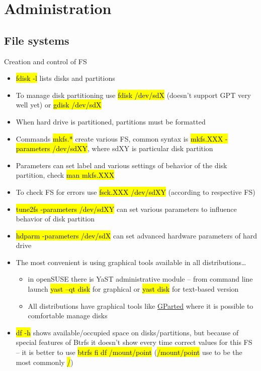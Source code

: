 \documentclass[compress, ucs, xelatex, 11pt, xcolor=svgnames,
  hyperref={
    bookmarks=true,
    unicode=true,
    colorlinks=true,
    pdftitle={Linux, command line and MetaCentrum},
    plainpages=false,
    pdfauthor={Vojtech Zeisek},
    pdfsubject={Course about use of Linux command line, writing shell scripts and using MetaCentrum of CESNET},
    pdfcreator={XeLaTeX},
    pdfkeywords={Linux, GNU, BASH, shell, command line, MetaCentrum},
    linkcolor=Red,
    anchorcolor=Blue,
    citecolor=Purple,
    filecolor=DodgerBlue,
    menucolor=DarkOrchid,
    urlcolor=DeepSkyBlue,
    pdftex},
  url={hyphens, lowtilde} %
  ]{beamer}
\renewcommand{\texttt}[1]{\hl{\ttfamily #1}}
\begin{document}
\section{Administration}

\subsection{File systems}

\begin{frame}[allowframebreaks]{Creation and control of FS}
\begin{itemize}
  \item \texttt{fdisk -l} lists disks and partitions
  \item To manage disk partitioning use \texttt{fdisk /dev/sdX} (doesn't support GPT very well yet) or \texttt{gdisk /dev/sdX}
  \item When hard drive is partitioned, partitions must be formatted
  \item Commands \texttt{mkfs.*} create various FS, common syntax is \texttt{mkfs.XXX -parameters /dev/sdXY}, where sdXY is particular disk partition
  \item Parameters can set label and various settings of behavior of the disk partition, check \texttt{man mkfs.XXX}
  \item To check FS for errors use \texttt{fsck.XXX /dev/sdXY} (according to respective FS)
  \item \texttt{tune2fs -parameters /dev/sdXY} can set various parameters to influence behavior of disk partition
  \item \texttt{hdparm -parameters /dev/sdX} can set advanced hardware parameters of hard drive
  \item The most convenient is using graphical tools available in all distributions\ldots
  \begin{itemize}
    \item in openSUSE there is YaST administrative module -- from command line launch \texttt{yast --qt disk} for graphical or \texttt{yast disk} for text-based version
    \item All distributions have graphical tools like \href{http://gparted.org/}{GParted} where it is possible to comfortable manage disks
  \end{itemize}
  \item \texttt{df -h} shows available/occupied space on disks/partitions, but because of special features of Btrfs it doesn't show every time correct values for this FS -- it is better to use \texttt{btrfs fi df /mount/point} (\texttt{/mount/point} use to be the most commonly \texttt{/})
\end{itemize}
\end{frame}
\end{document}

